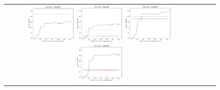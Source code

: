 \begin{figure}[h!]
\begin{tabular}{cccc}
  \includegraphics[width=0.25\textwidth]{Kap5/linear_INDIVIDUAL_CURVES_train=b234test=b261.png}  
  \includegraphics[width=0.25\textwidth]{Kap5/linear_INDIVIDUAL_CURVES_train=b234test=b360.png}
  \includegraphics[width=0.25\textwidth]{Kap5/linear_INDIVIDUAL_CURVES_train=b261test=b278.png}  
  \includegraphics[width=0.25\textwidth]{Kap5/linear_INDIVIDUAL_CURVES_train=b261test=b360.png} \\


\end{tabular}
\end{figure}
